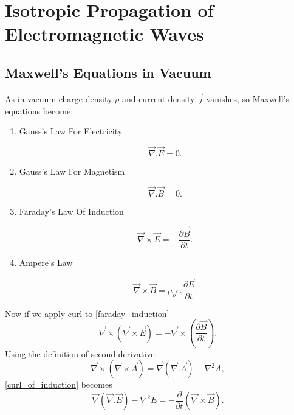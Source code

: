 \chapter{Isotropic Propagation of Electromagnetic Waves}

\section{Maxwell's Equations in Vacuum}

As in vacuum charge density $\rho$ and current density $\vec{j}$ vanishes, so Maxwell's equations become:

\begin{enumerate}

   \item Gauss's Law For Electricity

      \begin{equation}\label{gauss_law}
      \vec{\nabla}.\vec{E} = 0.
      \end{equation}

   \item Gauss's Law For Magnetism

      \begin{equation}
      \vec{\nabla}.\vec{B} = 0.
      \end{equation}

   \item Faraday's Law Of Induction

      \begin{equation}\label{faraday_induction}
      \vec{\nabla}\times\vec{E} = - \frac{\partial\vec{B}}{\partial t}.
      \end{equation}

   \item Ampere's Law

      \begin{equation}\label{amperes_law}
      \vec{\nabla}\times\vec{B} = \mu_{o}\epsilon_{o}\frac{\partial\vec{E}}{\partial t}.
      \end{equation}

\end{enumerate}

Now if we apply curl to \eqref{faraday_induction}
%
   \begin{equation}\label{curl_of_induction}
   \vec{\nabla}\times(\vec{\nabla}\times\vec{E}) = - \vec{\nabla}\times(\frac{\partial\vec{B}}{\partial t}).
   \end{equation}
%
Using the definition of second derivative:
%
   \begin{equation}
   \vec{\nabla}\times(\vec{\nabla}\times\vec{A}) = \vec{\nabla}(\vec{\nabla}.\vec{A})-{\nabla}^2A,
   \end{equation}
%
\eqref{curl_of_induction} becomes
%
   \begin{equation}
   \vec{\nabla}(\vec{\nabla}.\vec{E})-{\nabla}^2E = - \frac{\partial}{\partial t}(\vec{\nabla}\times\vec{B}).
   \end{equation}

